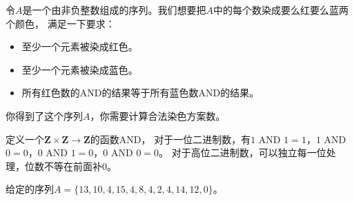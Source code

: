 \vspace{6pt} \par
令$A$是一个由非负整数组成的序列。我们想要把$A$中的每个数染成要么红要么蓝两个颜色，
满足一下要求：
\begin{itemize}
\item 至少一个元素被染成红色。
\item 至少一个元素被染成蓝色。
\item 所有红色数的AND的结果等于所有蓝色数AND的结果。
\end{itemize}
\par 你得到了这个序列$A$，你需要计算合法染色方案数。
\par
定义一个$\mathbf{Z} \times \mathbf{Z} \to \mathbf{Z}$的函数AND，
对于一位二进制数，有$1$ AND $1 = 1$，$1$ AND $0 = 0$，$0$ AND $1 = 0$，$0$ AND $0 = 0$。
对于高位二进制数，可以独立每一位处理，位数不等在前面补0。\par
给定的序列$A=\{13,10,4,15,4,8,4,2,4,14,12,0\}$。
